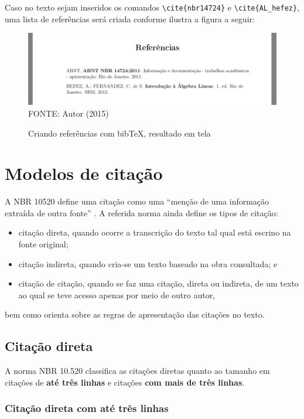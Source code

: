 Caso no texto sejam inseridos os comandos \verb!\cite{nbr14724}! e \verb!\cite{AL_hefez}!, uma lista de referências será criada conforme ilustra a figura a seguir:
	\begin{figure}[H]
	\centering
	\caption{Criando referências com bibTeX, resultado em tela}
	\includegraphics[scale=0.45]
	{img/fig09.png}\label{fig09}\\
	FONTE: Autor (2015)
	\end{figure}


\section{Modelos de citação}

A NBR 10520 define uma citação como uma ``menção de uma informação extraída de outra fonte'' \cite[p.~1]{nbr10520}. A referida norma ainda define os tipos de citação:
\begin{itemize} 
	\item citação direta, quando ocorre a transcrição do texto tal qual está escrino na fonte original;
	\item citação indireta, quando cria-se um texto baseado na obra consultada; e
	\item citação de citação, quando se faz uma citação, direta ou indireta, de um texto ao qual se teve acesso apenas por meio de outro autor,
\end{itemize}
bem como orienta sobre as regras de apresentação das citações no texto.


\subsection{Citação direta}

A norma NBR 10.520 classifica as citações diretas quanto ao tamanho em citações de \textbf{até três linhas} e citações \textbf{com mais de três linhas}. 


\subsubsection{Citação direta com até três linhas}


